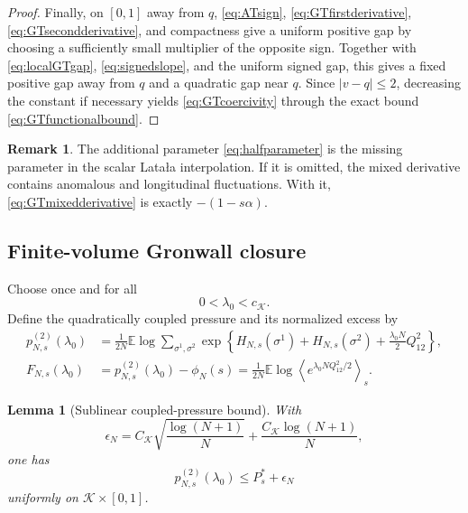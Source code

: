 \documentclass[11pt]{article}
\numberwithin{equation}{section}
\theoremstyle{plain}
\newtheorem{lemma}[theorem]{Lemma}
\theoremstyle{definition}
\newtheorem{remark}[theorem]{Remark}
\newcommand{\E}{\mathbb E}
\newcommand{\1}{\mathbf 1}
\newcommand{\cK}{\mathcal K}
\begin{document}
\begin{proof}
Finally, on $[0,1]$ away from $q$,
\eqref{eq:ATsign}, \eqref{eq:GTfirstderivative},
\eqref{eq:GTsecondderivative}, and compactness give a uniform positive
gap by choosing a sufficiently small multiplier of the opposite
sign.  Together with \eqref{eq:localGTgap},
\eqref{eq:signedslope}, and the uniform signed gap, this gives a
fixed positive gap away from $q$ and a quadratic gap near $q$.
Since $|v-q|\le2$, decreasing the constant if necessary yields
\eqref{eq:GTcoercivity} through the exact bound
\eqref{eq:GTfunctionalbound}.
\end{proof}

\begin{remark}
The additional parameter \eqref{eq:halfparameter} is the missing
parameter in the scalar Lata\l a interpolation.  If it is omitted, the
mixed derivative contains anomalous and longitudinal fluctuations.
With it, \eqref{eq:GTmixedderivative} is exactly
$-(1-s\alpha)$.
\end{remark}

\subsection{Finite-volume Gronwall closure}\label{subsec:gronwall}

Choose once and for all
\begin{equation}
 0<\lambda_0<c_{\cK}.
 \label{eq:lambda0}
\end{equation}
Define the quadratically coupled pressure and its normalized excess by
\begin{align}
 p^{(2)}_{N,s}(\lambda_0)
 &=
 \frac1{2N}\E\log
 \sum_{\sigma^1,\sigma^2}
 \exp\left\{
 H_{N,s}(\sigma^1)+H_{N,s}(\sigma^2)
 +\frac{\lambda_0N}{2}Q_{12}^2\right\},
 \label{eq:quadraticpressure}\\
 F_{N,s}(\lambda_0)
 &=
 p^{(2)}_{N,s}(\lambda_0)-\phi_N(s)
 =
 \frac1{2N}\E\log
 \left\langle e^{\lambda_0NQ_{12}^2/2}\right\rangle_s.
 \label{eq:normalizedcoupling}
\end{align}

\begin{lemma}[Sublinear coupled-pressure bound]
\label{lem:sublinearpressure}
With
\[
 \epsilon_N=C_{\cK}
 \sqrt{\frac{\log(N+1)}N}+\frac{C_{\cK}\log(N+1)}N,
\]
one has
\begin{equation}
 p^{(2)}_{N,s}(\lambda_0)\le P_s^*+\epsilon_N
 \label{eq:pressureenvelope}
\end{equation}
uniformly on $\cK\times[0,1]$.
\end{lemma}
\end{document}
